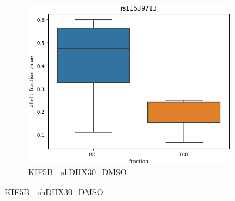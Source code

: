 \documentclass{beamer}
\begin{document}
\begin{frame}
\begin{figure}
\begin{subfigure}{0.33\textwidth}
			 	\caption{KIF5B - shDHX30\_DMSO}
			 	\includegraphics[width=\textwidth]{media/shDHX30_DMSO_rs11539713.png}
			 \end{subfigure}
			\end{figure}
		 \end{frame}
\end{document}
